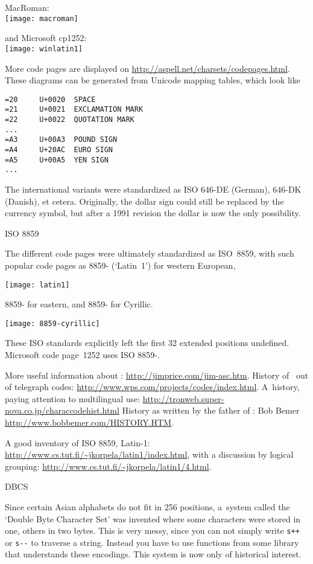 MacRoman:\\
\texttt{[image: macroman]}

and Microsoft cp1252:\\
\texttt{[image: winlatin1]}

More code pages are displayed on
\url{http://aspell.net/charsets/codepages.html}.
These diagrams can be generated from Unicode mapping tables, which
look like
\begin{verbatim}
=20     U+0020  SPACE
=21     U+0021  EXCLAMATION MARK
=22     U+0022  QUOTATION MARK
...
=A3     U+00A3  POUND SIGN
=A4     U+20AC  EURO SIGN
=A5     U+00A5  YEN SIGN
...
\end{verbatim}

The international variants were standardized as ISO 646-DE (German),
646-DK (Danish), et cetera. Originally, the dollar sign could still be
replaced by the currency symbol, but after a 1991 revision the dollar
is now the only possibility.

 {ISO 8859}

The
different code pages were ultimately standardized as ISO~8859, with such popular code pages as
8859- (`Latin~1') for western European,

\texttt{[image: latin1]}

8859- for
eastern, and 8859- for Cyrillic.

\texttt{[image: 8859-cyrillic]}

These ISO standards
explicitly left the first 32 extended positions undefined. Microsoft
code page~1252 uses ISO 8859-.

More useful information about \ascii:
\url{http://jimprice.com/jim-asc.htm}. History of \ascii\ out of
telegraph codes:
\url{http://www.wps.com/projects/codes/index.html}. A~history, paying
attention to multilingual use:
\url{http://tronweb.super-nova.co.jp/characcodehist.html} History as
written by the father of \ascii: Bob Bemer
\url{http://www.bobbemer.com/HISTORY.HTM}.

A good inventory of ISO 8859, Latin-1:
\url{http://www.cs.tut.fi/~jkorpela/latin1/index.html}, with a
discussion by logical grouping:
\url{http://www.cs.tut.fi/~jkorpela/latin1/4.html}.

 {DBCS}

Since certain Asian alphabets do not fit in 256 positions, a~system
called the `Double Byte Character Set' was invented where
some characters were stored in one, others in two bytes. This is very
messy, since you can not simply write \verb-s++- or \verb+s--+ to
traverse a string. Instead you have to use functions from some library
that understands these encodings. This system is now only of
historical interest.

